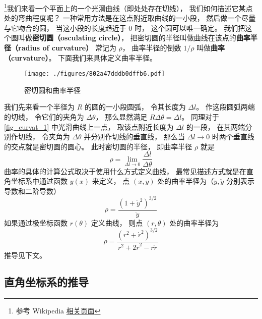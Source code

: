

\footnote{参考 Wikipedia \href{https://en.wikipedia.org/wiki/Curvature}{相关页面}}我们来看一个平面上的一个光滑曲线（即处处存在切线）， 我们如何描述它某点处的弯曲程度呢？ 一种常用方法是在这点附近取曲线的一小段， 然后做一个尽量与它吻合的圆， 当这小段的长度趋近于 0 时， 这个圆可以唯一确定。 我们把这个圆叫做\textbf{密切圆（osculating circle）}， 把密切圆的半径叫做曲线在该点的\textbf{曲率半径（radius of curvature）} 常记为 $\rho$， 曲率半径的倒数 $1/\rho$ 叫做\textbf{曲率（curvature）}。 下面我们来具体定义曲率半径。
\begin{figure}[ht]
\centering
\texttt{[image: ./figures/802a47dddb0dffb6.pdf]}
\caption{密切圆和曲率半径} \label{fig_curvat_1}
\end{figure}

我们先来看一个半径为 $R$ 的圆的一小段圆弧， 令其长度为 $\Delta l$。 作这段圆弧两端的切线， 令它们的夹角为 $\Delta \theta$， 那么显然满足 $R \Delta\theta = \Delta l$。 同理对于\autoref{fig_curvat_1} 中光滑曲线上一点， 取该点附近长度为 $\Delta l$ 的一段， 在其两端分别作切线， 令夹角为 $\Delta\theta$ 并分别作切线的垂直线， 那么当 $\Delta l \to 0$ 时两个垂直线的交点就是密切圆的圆心。 此时密切圆的半径， 即曲率半径 $\rho$ 就是
\begin{equation}\label{eq_curvat_3}
\rho = \lim_{\Delta l \to 0} \frac{\Delta l}{\Delta \theta}
\end{equation}
曲率的具体的计算公式取决于使用什么方式定义曲线， 最常见描述方式就是在直角坐标系中通过函数 $y(x)$ 来定义， 点 $(x, y)$ 处的曲率半径为（$\dot y, \ddot y$ 分别表示导数和二阶导数）
\begin{equation}
\rho = \frac{(1 + \dot y^2)^{3/2}}{\ddot y}
\end{equation}
如果通过极坐标函数 $r(\theta)$ 定义曲线， 则点 $(r, \theta)$ 处的曲率半径为
\begin{equation}
\rho = \frac{(r^2 + \dot r^2)^{3/2}}{r^2 + 2\dot r^2 - r\ddot r}
\end{equation}
推导见下文。

\subsection{直角坐标系的推导}

